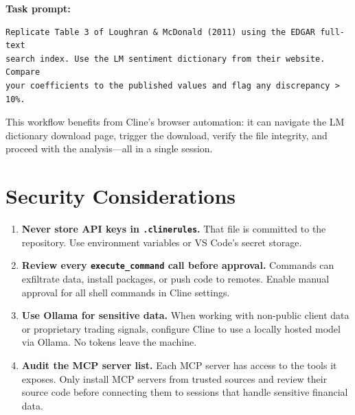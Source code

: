 \textbf{Task prompt:}
\begin{verbatim}
Replicate Table 3 of Loughran & McDonald (2011) using the EDGAR full-text
search index. Use the LM sentiment dictionary from their website. Compare
your coefficients to the published values and flag any discrepancy > 10%.
\end{verbatim}

This workflow benefits from Cline's browser automation: it can navigate the
LM dictionary download page, trigger the download, verify the file integrity,
and proceed with the analysis---all in a single session.

\section{Security Considerations}
\label{app:cline:security}

\begin{enumerate}
  \item \textbf{Never store API keys in \texttt{.clinerules}.}  That file is
        committed to the repository.  Use environment variables or VS Code's
        secret storage.

  \item \textbf{Review every \texttt{execute\_command} call before approval.}
        Commands can exfiltrate data, install packages, or push code to remotes.
        Enable manual approval for all shell commands in Cline settings.

  \item \textbf{Use Ollama for sensitive data.}  When working with non-public
        client data or proprietary trading signals, configure Cline to use a
        locally hosted model via Ollama.  No tokens leave the machine.

  \item \textbf{Audit the MCP server list.}  Each MCP server has access to
        the tools it exposes.  Only install MCP servers from trusted sources
        and review their source code before connecting them to sessions that
        handle sensitive financial data.
\end{enumerate}
